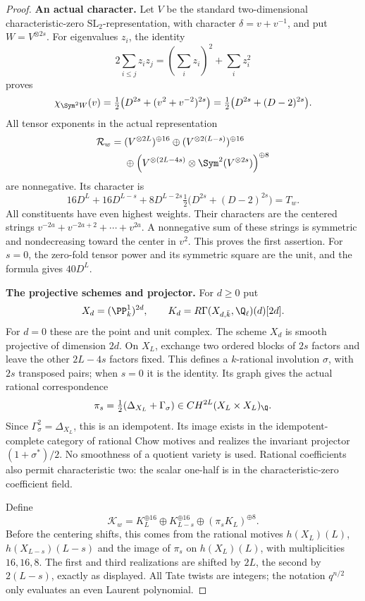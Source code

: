 \begin{proof}
\par\smallskip\noindent\textbf{An actual character.}\quad
Let $V$ be the standard two-dimensional characteristic-zero
$\mathrm{SL}_2$-representation, with character $\delta=v+v^{-1}$,
and put $W=V^{\otimes2s}$. For eigenvalues $z_i$, the identity
\[
 2\sum_{i\le j}z_iz_j=(\sum_i z_i)^2+\sum_i z_i^2
\]
proves
\[
 \chi_{\Sym^2W}(v)
   =\tfrac12\bigl(D^{2s}+(v^2+v^{-2})^{2s}\bigr)
   =\tfrac12\bigl(D^{2s}+(D-2)^{2s}\bigr).
\]
All tensor exponents in the actual representation
\begin{align*}
 \mathcal R_w={}&(V^{\otimes2L})^{\oplus16}
 \oplus(V^{\otimes2(L-s)})^{\oplus16}\\
 &\oplus\left(V^{\otimes(2L-4s)}
                    \otimes\Sym^2(V^{\otimes2s})\right)^{\oplus8}
\end{align*}
are nonnegative. Its character is
\[
 16D^L+16D^{L-s}
 +8D^{L-2s}\tfrac12\bigl(D^{2s}+(D-2)^{2s}\bigr)=T_w.
\]
All constituents have even highest weights. Their characters are
the centered strings $v^{-2a}+v^{-2a+2}+\cdots+v^{2a}$.
A nonnegative sum of these strings is symmetric and nondecreasing
toward the center in $v^2$. This proves the first assertion.
For $s=0$, the zero-fold tensor power and its symmetric square
are the unit, and the formula gives $40D^L$.

\par\smallskip\noindent\textbf{The projective schemes and projector.}\quad
For $d\ge0$ put
\[
 X_d=(\PP^1_k)^{2d},\qquad
 K_d=R\Gamma(X_{d,\bar k},\Q_\ell)(d)[2d].
\]
For $d=0$ these are the point and unit complex. The scheme $X_d$
is smooth projective of dimension $2d$.
On $X_L$, exchange two ordered blocks of $2s$ factors and leave
the other $2L-4s$ factors fixed. This defines a $k$-rational
involution $\sigma$, with $2s$ transposed pairs; when $s=0$ it
is the identity. Its graph gives the actual rational correspondence
\[
 \pi_s=\tfrac12(\Delta_{X_L}+\Gamma_\sigma)
       \in CH^{2L}(X_L\times X_L)_\Q.
\]
Since $\Gamma_\sigma^2=\Delta_{X_L}$, this is an idempotent.
Its image exists in the idempotent-complete category of rational
Chow motives and realizes the invariant projector $(1+\sigma^*)/2$.
No smoothness of a quotient variety is used. Rational coefficients
also permit characteristic two: the scalar one-half is in the
characteristic-zero coefficient field.

Define
\begin{equation}\label{eq:wordcomplex}
 \mathcal K_w=K_L^{\oplus16}\oplus K_{L-s}^{\oplus16}
                         \oplus(\pi_sK_L)^{\oplus8}.
\end{equation}
Before the centering shifts, this comes from the rational motives
$h(X_L)(L)$, $h(X_{L-s})(L-s)$ and the image of $\pi_s$ on
$h(X_L)(L)$, with multiplicities $16,16,8$.
The first and third realizations are shifted by $2L$, the second
by $2(L-s)$, exactly as displayed. All Tate twists are integers;
the notation $q^{n/2}$ only evaluates an even Laurent polynomial.


\end{proof}
